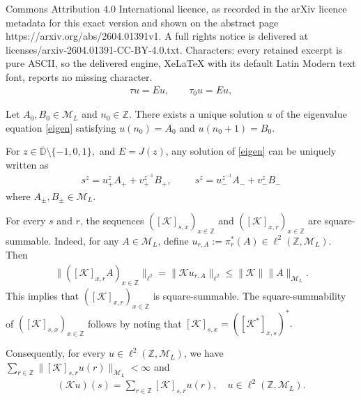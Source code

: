 \documentclass[10pt,a4paper]{amsart}
\begin{document}
Commons Attribution 4.0 International licence, as recorded in the arXiv licence metadata for this exact version and shown on the abstract page https://arxiv.org/abs/2604.01391v1. A full rights notice is delivered at licenses/arxiv-2604.01391-CC-BY-4.0.txt. Characters: every retained excerpt is pure ASCII, so the delivered engine, XeLaTeX with its default Latin Modern text font, reports no missing character.
\begin{align}\label{eigen}
 \tau u = E u, \qquad \tau_0 u = E u,
 \end{align}

 \begin{teo}\label{cauhyproblem}
   Let \(A_{0}, B_{0} \in \mathcal{M}_{L}\) and \(n_{0} \in \mathbb{Z}\). There exists a unique solution \(u\) of the eigenvalue equation \eqref{eigen} satisfying \(u(n_{0}) = A_{0}\) and \(u(n_{0}+1) = B_{0}\).
 \end{teo}

\begin{propo}\label{base}
For $z\in \overline{\mathbb{D}}\setminus \{-1, 0, 1\},$ and $E=J(z)$, any solution of \eqref{eigen} can be uniquely written as 
\begin{align}\label{yh}
s^{z} = u^{z}_+ A_+ + v^{z^{- 1}}_+ B_+, \hspace{1cm} 
s^{z} = u^{z^{ - 1}}_- A_- + v^{z}_- B_-
\end{align} 
where $A_\pm,B_\pm \in \mathcal{M}_{L}$. 
\end{propo}

\begin{obs}\label{RKsr}
For every $s$ and $r$, the sequences $([\mathcal{K}]_{s,x})_{x \in \mathbb{Z}}$ and $([\mathcal{K}]_{x,r})_{x \in \mathbb{Z}}$ are square-summable. Indeed, for any $A \in \mathcal{M}_L$, define $u_{r,A} := \pi^{*}_{r}(A) \in \ell^{2}(\mathbb{Z},\mathcal{M}_{L})$. Then
\begin{align}\label{KER}
\|([\mathcal{K}]_{x,r}A)_{x \in \mathbb{Z}}\|_{\ell^{2}} = \|\mathcal{K}u_{r,A}\|_{\ell^{2}} \leq \|\mathcal{K}\| \|A\|_{\mathcal{M}_L}.
\end{align}
This implies that $([\mathcal{K}]_{x,r})_{x \in \mathbb{Z}}$ is square-summable. The square-summability of $([\mathcal{K}]_{s,x})_{x \in \mathbb{Z}}$ follows by noting that
$ 
[\mathcal{K}]_{s,x} = \left([\mathcal{K}^*]_{x,s}\right)^*.
$ 

Consequently, for every $u \in \ell^{2}(\mathbb{Z},\mathcal{M}_{L})$, we have $\sum_{r\in \mathbb{Z}} \|[\mathcal{K}]_{s,r}u(r)\|_{\mathcal{M}_L} < \infty$ and
\begin{align}
(\mathcal{K}u)(s) = \sum_{r\in \mathbb{Z}} [\mathcal{K}]_{s,r}u(r), \quad u \in \ell^{2}(\mathbb{Z},\mathcal{M}_{L}).
\end{align}
\end{obs}
\end{document}
